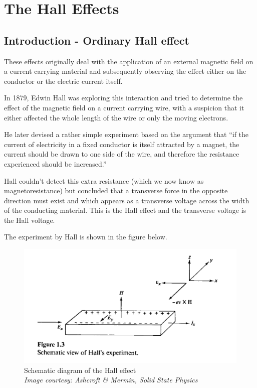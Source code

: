 \chapter{The Hall Effects}

\label{chapter2}

\section{Introduction - Ordinary Hall effect} \label{sec:ohe}

These effects originally deal with the application of an external magnetic field on a current carrying material and subsequently observing the effect either on the conductor or the electric current itself.

In 1879, Edwin Hall was exploring this interaction and tried to determine the effect of the magnetic field on a current carrying wire, with a suspicion that it either affected the whole length of the wire or only the moving electrons.

He later devised a rather simple experiment based on the argument that ``if the current of electricity in a fixed conductor is itself attracted by a magnet, the current should be drawn to one side of the wire, and therefore the resistance experienced should be increased.'' \cite{S.1880}

Hall couldn't detect this extra resistance (which we now know as magnetoresistance) but concluded that a transverse force in the opposite direction must exist and which appears as a transverse voltage across the width of the conducting material.
This is the Hall effect and the transverse voltage is the Hall voltage.

The experiment by Hall is shown in the figure below.

\begin{figure}[h!]
    \includegraphics[width=0.7\columnwidth]{hall-effect-ashcroft.png}
    \caption{Schematic diagram of the Hall effect\\ \textit{Image courtesy: Ashcroft \& Mermin, Solid State Physics}}
    \label{hall-figure}
\end{figure}


